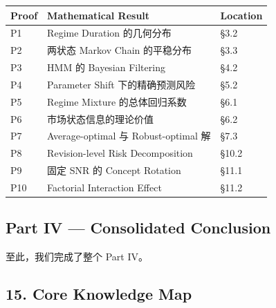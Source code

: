 \begin{readertable}
\begin{longtable}[]{@{}
  >{\raggedright\arraybackslash}p{}
  >{\raggedright\arraybackslash}p{}
  >{\raggedright\arraybackslash}p{}@{}}
\toprule
Proof & Mathematical Result & Location \\
\midrule
\endhead
P1 & Regime Duration 的几何分布 & §3.2 \\
P2 & 两状态 Markov Chain 的平稳分布 & §3.3 \\
P3 & HMM 的 Bayesian Filtering & §4.2 \\
P4 & Parameter Shift 下的精确预测风险 & §5.2 \\
P5 & Regime Mixture 的总体回归系数 & §6.1 \\
P6 & 市场状态信息的理论价值 & §6.2 \\
P7 & Average-optimal 与 Robust-optimal 解 & §7.3 \\
P8 & Revision-level Risk Decomposition & §10.2 \\
P9 & 固定 SNR 的 Concept Rotation & §11.1 \\
P10 & Factorial Interaction Effect & §11.2 \\
\bottomrule
\end{longtable}
\end{readertable}

\hypertarget{part-4-77-0001-part-iv-consolidated-conclusion}{%
\subsection{Part IV --- Consolidated Conclusion}\label{part-4-77-0001-part-iv-consolidated-conclusion}}

至此，我们完成了整个 Part IV。

\hypertarget{part-4-77-0001-core-knowledge-map}{%
\subsection{15. Core Knowledge Map}\label{part-4-77-0001-core-knowledge-map}}

